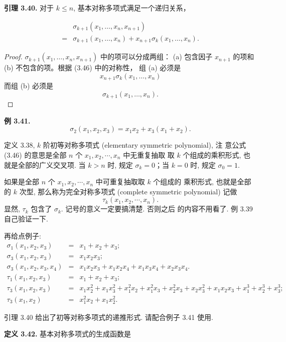\documentclass[a4paper]{ctexart}
\begin{document}
{\noindent \textbf{引理 3.40.} 对于 $k \leq n$, 基本对称多项式满足一个递归关系，

\begin{align*}
&\sigma_{k+1}(x_1, \ldots, x_n, x_{n+1}) \\
=& \sigma_{k+1}(x_1, \ldots, x_n) + x_{n+1} \sigma_k(x_1, \ldots, x_n). 
\tag{3.48}
\end{align*}

\begin{proof}
$\sigma_{k+1}(x_{1}, \ldots, x_{n}, x_{n+1})$ 中的项可以分成两组：
(a) 包含因子 $x_{n+1}$ 的项和 (b) 不包含的项。根据 (3.46) 中的对称性，
组 (a) 必须是 
$$
x_{n+1} \sigma_{k}(x_{1}, \ldots, x_{n})
$$ 
而组 (b) 必须是 
$$
\sigma_{k+1}(x_{1}, \ldots, x_{n}).
$$
\end{proof} 

\noindent \textbf{例 3.41.} 
$$
\sigma_2(x_1, x_2, x_3) = x_1 x_2 + x_3(x_1 + x_2).
$$

定义 3.38, $k$ 阶初等对称多项式 (elementary symmetric polynomial), 注
意公式(3.46) 的意思是全部 $n$ 个 $x_1, x_2, \cdots, x_n$ 中无重复抽取
取 $k$ 个组成的乘积形式, 也就是全部的广义交叉项. 当 $k > n$ 时,
规定 $\sigma_k = 0$；当 $k = 0$ 时, 规定 $\sigma_0 = 1$.

如果是全部 $n$ 个 $x_1, x_2, \cdots, x_n$ 中可重复抽取取 $k$ 个组成的
乘积形式, 也就是全部的 $k$ 次型, 那么称为完全对称多项式 (complete
symmetric polynomial) 记做
$$
\tau_k(x_1, x_2, \cdots, x_n).
$$
显然, $\tau_k$ 包含了 $\sigma_k$. 记号的意义一定要搞清楚. 否则之后
的内容不用看了. 例 3.39 自己验证一下.

再给点例子:
$$
\begin{array}{rcl}
  \sigma_1(x_1, x_2, x_3) &=& x_1 + x_2 + x_3; \\
  \sigma_3(x_1, x_2, x_3) &=& x_1x_2x_3; \\
  \sigma_3(x_1, x_2, x_3, x_4) &=& x_1x_2x_3 + x_1x_2x_4 + x_1x_3x_4 + x_2x_3x_4.\\
  \tau_1(x_1, x_2, x_3) &=& x_1 + x_2 + x_3;\\
  \tau_3(x_1, x_2, x_3) &=& x_1x_2^2 + x_1x_3^2 + x_1^2x_2 + x_1^2x_3 + x_2^2x_3 + x_2x_3^2 + x_1x_2x_3 + x_1^3 + x_2^3 + x_3^3;\\
  \tau_3(x_1, x_2) &=& x_1^2x_2 + x_1x_2^2.
\end{array}
$$



引理 3.40 给出了初等对称多项式的递推形式. 请配合例子 3.41 使用.

\noindent \textbf{定义 3.42.} 基本对称多项式的生成函数是

}
\end{document}

